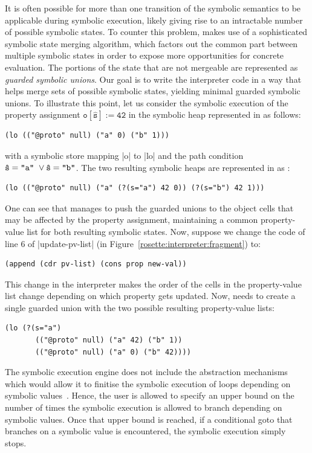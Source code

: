 It is often possible for more than one transition of the symbolic 
semantics to be applicable during symbolic execution, likely 
giving rise to an intractable number of possible symbolic states. 
To counter this problem, \rosette makes use of a sophisticated 
symbolic state merging algorithm, which factors out the common 
part between multiple symbolic states  in order to expose more 
opportunities for concrete evaluation. The portions of the state 
that are not mergeable are represented as \emph{guarded symbolic unions}. 
Our goal is to write the interpreter code in a way that helps 
\rosette merge sets of possible symbolic states, yielding minimal 
guarded symbolic unions.
To illustrate this point, let us consider the symbolic execution 
of the property assignment $\mathtt{o[\hat{s}] := 42}$ in the 
symbolic heap represented in \rosette as follows: 
%
\begin{lstlisting}
(lo (("@proto" null) ("a" 0) ("b" 1)))
\end{lstlisting}
%
with a symbolic store mapping \schemeinline|o| to \schemeinline|lo| and 
the path condition {\small $\mathtt{\hat{s} = \text{\texttt{"a"}} \ \vee \hat{s} = \text{\texttt{"b"}}}$}.
The two resulting symbolic heaps are represented in \rosette as :  
%
\begin{lstlisting}
(lo (("@proto" null) ("a" (?(s="a") 42 0)) (?(s="b") 42 1)))
\end{lstlisting}
%
One can see that \rosette manages to push the guarded unions to 
the object cells that may be affected by the property assignment, maintaining a common 
property-value list for both resulting symbolic states. 
%
Now, suppose we change the code of line 6 of \schemeinline|update-pv-list| 
(in Figure~\ref{rosette:interpreter:fragment}) to:  
\begin{lstlisting}
(append (cdr pv-list) (cons prop new-val))
\end{lstlisting}
This change in the interpreter makes the order of the cells in the property-value 
list change depending on which property gets updated. 
Now, \rosette needs to create a single guarded union 
with the two possible resulting property-value lists: 
\begin{lstlisting}
(lo (?(s="a") 
       (("@proto" null) ("a" 42) ("b" 1)) 
       (("@proto" null) ("a" 0) ("b" 42))))
\end{lstlisting}

 The \jsil symbolic execution engine does not 
include the abstraction mechanisms which would allow it to finitise the symbolic 
execution of loops depending on symbolic values~\cite{abstract:symbolic:exec}. 
Hence, the user is allowed to specify an upper bound on the number of times
the symbolic execution is allowed to branch depending on symbolic values. 
Once that upper bound is reached, if a conditional goto that branches 
on a symbolic value is encountered, the symbolic execution simply stops.  



